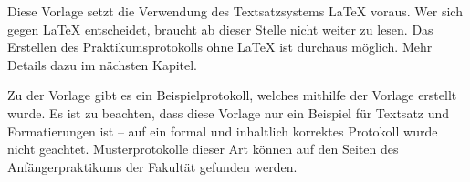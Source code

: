 Diese Vorlage setzt die Verwendung des Textsatzsystems LaTeX voraus. Wer sich gegen LaTeX entscheidet, braucht ab dieser Stelle nicht weiter zu lesen. Das Erstellen des Praktikumsprotokolls ohne LaTeX ist durchaus möglich. Mehr Details dazu im nächsten Kapitel.

Zu der Vorlage gibt es ein Beispielprotokoll, welches mithilfe der Vorlage erstellt wurde. Es ist zu beachten, dass diese Vorlage nur ein Beispiel für Textsatz und Formatierungen ist – auf ein formal und inhaltlich korrektes Protokoll wurde nicht geachtet. Musterprotokolle dieser Art können auf den Seiten des Anfängerpraktikums der Fakultät gefunden werden.
